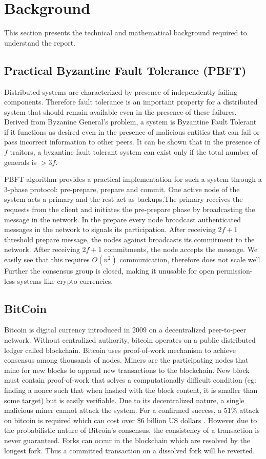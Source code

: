 \section{Background}
\label{background}

This section presents the technical and mathematical background required to understand the report.

\subsection{Practical Byzantine Fault Tolerance (PBFT)}
Distributed systems are characterized by presence of independently failing components. Therefore fault tolerance is an important property for a distributed system that should remain available even in the presence of these failures. Derived from Byzanine General's problem\cite{bgp}, a system is Byzantine Fault Tolerant if it functions as desired even in the presence of malicious entities that can fail or pass incorrect information to other peers. It can be shown that in the presence of $f$ traitors, a byzantine fault tolerant system can exist only if the total number of generals is $>3f$. 

PBFT algorithm \cite{PBFT} provides a practical implementation for such a system through a 3-phase protocol: pre-prepare, prepare and commit. One active node of the system acts a primary and the rest act as backups.The primary receives the requests from the client and initiates the pre-prepare phase by broadcasting the message in the network. In the prepare every node broadcast authenticated messages in the network to signals its participation. After receiving $2f +1$ threshold prepare message, the nodes against broadcasts its commitment to the network. After receiving $2f +1$ commitments, the node accepts the message. We easily see that this requires $O(n^2)$ communication, therefore does not scale well. Further the consensus group is closed, making it unusable for open permission-less systems like crypto-currencies.

\subsection{BitCoin}
Bitcoin is digital currency introduced in 2009 on a decentralized peer-to-peer network. Without centralized authority, bitcoin operates on a public distributed ledger called blockchain. Bitcoin uses proof-of-work mechanism to achieve consensus among thousands of nodes. Miners are the participating nodes that mine for new blocks to append new transactions to the blockchain. New block must contain proof-of-work that solves a computationally difficult condition (eg: finding a nonce such that when hashed with the block content, it is smaller than some target) but is easily verifiable.
Due to its decentralized nature, a single malicious miner cannot attack the system. For a confirmed success, a 51\% attack on bitcoin is required which can cost over \$6 billion US dollars \cite{51}. However due to the probabilistic nature of Bitcoin's consensus, the consistency of a transaction is never guaranteed. Forks can occur in the blockchain which are resolved by the longest fork. Thus a committed transaction on a dissolved fork will be reverted. 


